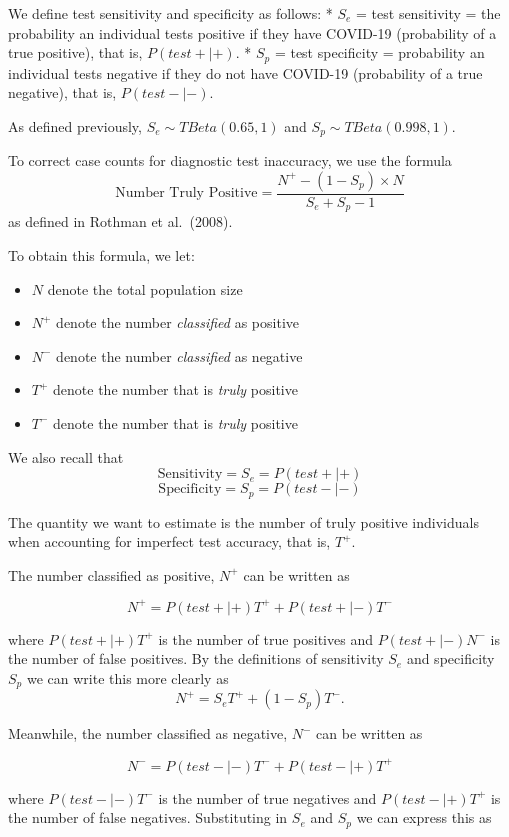 \documentclass[12pt,twoside]{smiththesis}
\providecommand{\tightlist}{%
  \setlength{\itemsep}{0pt}\setlength{\parskip}{0pt}}
\begin{document}
We define test sensitivity and specificity as follows:
* \(S_e\) = test sensitivity = the probability an individual tests positive if they have COVID-19 (probability of a true positive), that is, \(P(test + | +)\).
* \(S_p\) = test specificity = probability an individual tests negative if they do not have COVID-19 (probability of a true negative), that is, \(P(test - |-)\).

As defined previously, \(S_e \sim TBeta(0.65, 1)\) and \(S_p \sim TBeta(0.998, 1)\).

To correct case counts for diagnostic test inaccuracy, we use the formula
\[\text{Number Truly Positive} = \dfrac{N^+ - (1-S_p) \times N}{S_e+S_p-1}\]
as defined in Rothman et al.~(2008).

To obtain this formula, we let:
\begin{itemize}
\tightlist
\item
  \(N\) denote the total population size
\item
  \(N^+\) denote the number \emph{classified} as positive
\item
  \(N^-\) denote the number \emph{classified} as negative
\item
  \(T^+\) denote the number that is \emph{truly} positive
\item
  \(T^-\) denote the number that is \emph{truly} positive
\end{itemize}
We also recall that
\[ \text{Sensitivity} = S_e = P(test + | +) \]
\[ \text{Specificity} = S_p = P(test - | - ) \]

The quantity we want to estimate is the number of truly positive individuals when accounting for imperfect test accuracy, that is, \(T^+\).

The number classified as positive, \(N^+\) can be written as

\[ N^+ = P(test + | +) T^+ + P(test + | -) T^-\]

where \(P(test + | +) T^+\) is the number of true positives and \(P(test + | -) N^-\) is the number of false positives. By the definitions of sensitivity \(S_e\) and specificity \(S_p\) we can write this more clearly as
\[ N^+ =S_e T^+ + (1-S_p) T^-.\]

Meanwhile, the number classified as negative, \(N^-\) can be written as

\[ N^- = P(test - | -) T^- + P(test - | +) T^+\]

where \(P(test - | -) T^-\) is the number of true negatives and \(P(test - | +) T^+\) is the number of false negatives. Substituting in \(S_e\) and \(S_p\) we can express this as
\end{document}
